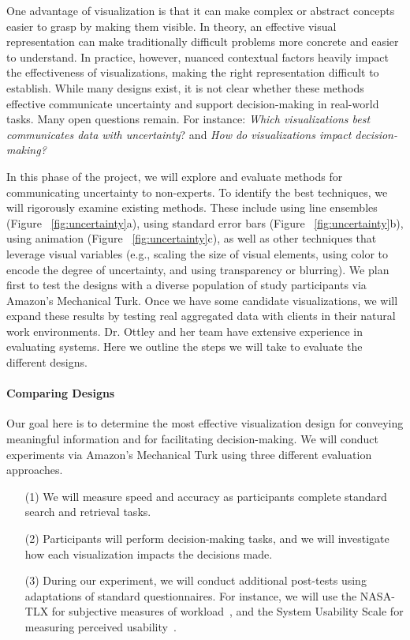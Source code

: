 One advantage of visualization is that it can make complex or abstract concepts easier to grasp by making them visible. In theory, an effective visual representation can make traditionally difficult problems more concrete and easier to understand. 
In practice, however, nuanced contextual factors heavily impact the effectiveness of visualizations, making the right representation difficult to establish.
While many designs exist, it is not clear whether these methods effective communicate uncertainty and support decision-making in real-world tasks.
Many open questions remain. For instance: \textit{Which visualizations best communicates data with uncertainty}? and \textit{How do
	visualizations impact decision-making?}

In this phase of the project, we will explore and evaluate methods for communicating uncertainty to non-experts.
To identify the best techniques, we will rigorously examine existing methods. 
These include using line ensembles (Figure ~\ref{fig:uncertainty}a), using standard error bars (Figure ~\ref{fig:uncertainty}b), using animation (Figure ~\ref{fig:uncertainty}c), as well as other techniques that leverage visual variables (e.g., scaling the size of visual elements, using color to encode the degree of uncertainty, and using transparency or blurring). 
We plan first to test the designs with a diverse population of study participants via Amazon's Mechanical Turk. 
Once we have some candidate visualizations, we will expand these results by testing real aggregated data with clients in their natural work environments.
Dr. Ottley and her team have extensive experience in evaluating systems.
Here we outline the steps we will take to evaluate the different designs.   

\paragraph{Comparing Designs} 
Our goal here is to determine the most effective visualization design for conveying meaningful information and for facilitating decision-making.  
We will conduct experiments via Amazon's Mechanical Turk using three different evaluation approaches.
\begin{itemize}
	\item[(1)] We will measure speed and accuracy as participants complete standard search and retrieval tasks.
	\item[(2)] Participants will perform decision-making tasks, and we will investigate how each visualization impacts the decisions made.
	\item[(3)] During our experiment, we will conduct additional post-tests using adaptations of standard questionnaires. For instance, we will use the NASA-TLX for subjective measures of workload~\cite{hart1988development}, and the System Usability Scale for measuring perceived usability~\cite{bangor2008empirical}. 
\end{itemize}



